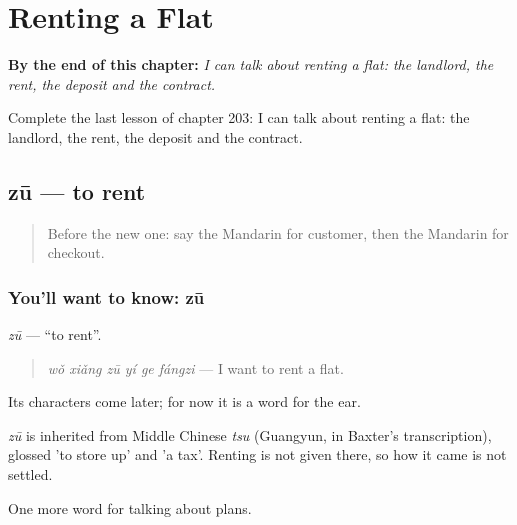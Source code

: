 
\chapter{Renting a Flat}
\label{ch:zh-renting-a-flat}

\begin{chapteropening}
\textbf{By the end of this chapter:} \emph{I can talk about renting a flat: the landlord, the rent, the deposit and the contract.}

Complete the last lesson of chapter 203: I can talk about renting a flat: the landlord, the rent, the deposit and the contract.
\end{chapteropening}

\section[zū]{zū — to rent}

\label{lesson:ZH-C203-zu}



\begin{quote}
Before the new one: say the Mandarin for customer, then the Mandarin for checkout.
\end{quote}

\subsection*{You'll want to know: zū}
\emph{zū} — \textquotedblleft{}to rent\textquotedblright{}.

\begin{quote}
\emph{wǒ xiǎng zū yí ge fángzi} — I want to rent a flat.
\end{quote}

Its characters come later; for now it is a word for the ear.

\begin{cousinweb}
\emph{zū} is inherited from Middle Chinese \emph{tsu} (Guangyun, in Baxter's transcription), glossed 'to store up' and 'a tax'. Renting is not given there, so how it came is not settled.
\end{cousinweb}

\begin{grammarlens}[title={What you've built}]
One more word for talking about plans.
\end{grammarlens}

